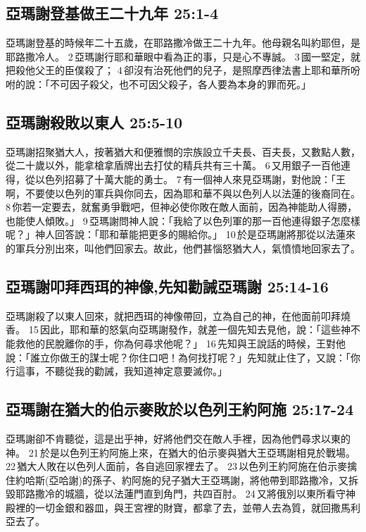 \subsection{亞瑪謝登基做王二十九年 25:1-4}
亞瑪謝登基的時候年二十五歲，在耶路撒冷做王二十九年。他母親名叫約耶但，是耶路撒冷人。 2 亞瑪謝行耶和華眼中看為正的事，只是心不專誠。 3 國一堅定，就把殺他父王的臣僕殺了； 4 卻沒有治死他們的兒子，是照摩西律法書上耶和華所吩咐的說：「不可因子殺父，也不可因父殺子，各人要為本身的罪而死。」

\subsection{亞瑪謝殺敗以東人 25:5-10}
亞瑪謝招聚猶大人，按著猶大和便雅憫的宗族設立千夫長、百夫長，又數點人數，從二十歲以外，能拿槍拿盾牌出去打仗的精兵共有三十萬。 6 又用銀子一百他連得，從以色列招募了十萬大能的勇士。 7 有一個神人來見亞瑪謝，對他說：「王啊，不要使以色列的軍兵與你同去，因為耶和華不與以色列人以法蓮的後裔同在。 8 你若一定要去，就奮勇爭戰吧，但神必使你敗在敵人面前，因為神能助人得勝，也能使人傾敗。」 9 亞瑪謝問神人說：「我給了以色列軍的那一百他連得銀子怎麼樣呢？」神人回答說：「耶和華能把更多的賜給你。」 10 於是亞瑪謝將那從以法蓮來的軍兵分別出來，叫他們回家去。故此，他們甚惱怒猶大人，氣憤憤地回家去了。

\subsection{亞瑪謝叩拜西珥的神像,先知勸誡亞瑪謝 25:14-16}
亞瑪謝殺了以東人回來，就把西珥的神像帶回，立為自己的神，在他面前叩拜燒香。 15 因此，耶和華的怒氣向亞瑪謝發作，就差一個先知去見他，說：「這些神不能救他的民脫離你的手，你為何尋求他呢？」 16 先知與王說話的時候，王對他說：「誰立你做王的謀士呢？你住口吧！為何找打呢？」先知就止住了，又說：「你行這事，不聽從我的勸誡，我知道神定意要滅你。」

\subsection{亞瑪謝在猶大的伯示麥敗於以色列王約阿施 25:17-24}
亞瑪謝卻不肯聽從，這是出乎神，好將他們交在敵人手裡，因為他們尋求以東的神。 21 於是以色列王約阿施上來，在猶大的伯示麥與猶大王亞瑪謝相見於戰場。 22 猶大人敗在以色列人面前，各自逃回家裡去了。 23 以色列王約阿施在伯示麥擒住約哈斯(亞哈謝)的孫子、約阿施的兒子猶大王亞瑪謝，將他帶到耶路撒冷，又拆毀耶路撒冷的城牆，從以法蓮門直到角門，共四百肘。 24 又將俄別以東所看守神殿裡的一切金銀和器皿，與王宮裡的財寶，都拿了去，並帶人去為質，就回撒馬利亞去了。

